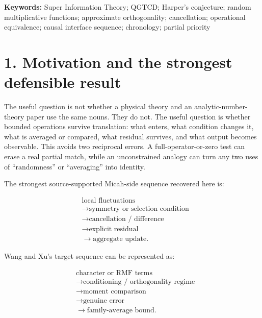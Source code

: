 \documentclass[
  american,
  11pt,
  letterpaper,
]{article}
\begin{document}
\noindent\textbf{Keywords:} Super Information Theory; QGTCD; Harper's conjecture; random multiplicative functions; approximate orthogonality; cancellation; operational equivalence; causal interface sequence; chronology; partial priority

\section{1. Motivation and the strongest defensible result}\label{motivation-and-the-strongest-defensible-result}

The useful question is not whether a physical theory and an analytic-number-theory paper use the same nouns. They do not. The useful question is whether bounded operations survive translation: what enters, what condition changes it, what is averaged or compared, what residual survives, and what output becomes observable. This avoids two reciprocal errors. A full-operator-or-zero test can erase a real partial match, while an unconstrained analogy can turn any two uses of ``randomness'' or ``averaging'' into identity.

The strongest source-supported Micah-side sequence recovered here is:

\begin{equation}
\begin{aligned}
& \text{local fluctuations} \\
& \rightarrow \text{symmetry or selection condition} \\
& \rightarrow \text{cancellation / difference} \\
& \rightarrow \text{explicit residual} \\
& \rightarrow \text{aggregate update}.
\end{aligned}
\tag{1}
\end{equation}

Wang and Xu's target sequence can be represented as:

\begin{equation}
\begin{aligned}
& \text{character or RMF terms} \\
& \rightarrow \text{conditioning / orthogonality regime} \\
& \rightarrow \text{moment comparison} \\
& \rightarrow \text{genuine error} \\
& \rightarrow \text{family-average bound}.
\end{aligned}
\tag{2}
\end{equation}
\end{document}
